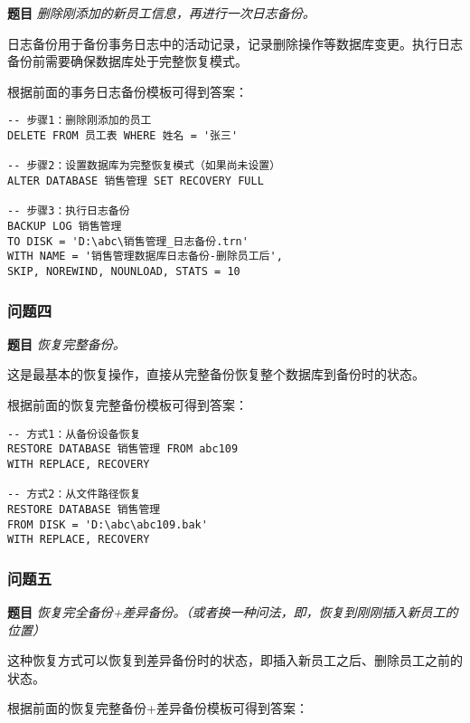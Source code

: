 \textbf{题目} \emph{删除刚添加的新员工信息，再进行一次日志备份。}

\qquad 日志备份用于备份事务日志中的活动记录，记录删除操作等数据库变更。执行日志备份前需要确保数据库处于完整恢复模式。

\qquad 根据前面的事务日志备份模板可得到答案：

\begin{mdframed}[backgroundcolor=blue!5]
\begin{verbatim}
-- 步骤1：删除刚添加的员工
DELETE FROM 员工表 WHERE 姓名 = '张三'

-- 步骤2：设置数据库为完整恢复模式（如果尚未设置）
ALTER DATABASE 销售管理 SET RECOVERY FULL

-- 步骤3：执行日志备份
BACKUP LOG 销售管理
TO DISK = 'D:\abc\销售管理_日志备份.trn'
WITH NAME = '销售管理数据库日志备份-删除员工后',
SKIP, NOREWIND, NOUNLOAD, STATS = 10
\end{verbatim}
\end{mdframed}

\subsubsection{问题四}

\textbf{题目} \emph{恢复完整备份。}

\qquad 这是最基本的恢复操作，直接从完整备份恢复整个数据库到备份时的状态。

\qquad 根据前面的恢复完整备份模板可得到答案：

\begin{mdframed}[backgroundcolor=blue!5]
\begin{verbatim}
-- 方式1：从备份设备恢复
RESTORE DATABASE 销售管理 FROM abc109
WITH REPLACE, RECOVERY

-- 方式2：从文件路径恢复
RESTORE DATABASE 销售管理
FROM DISK = 'D:\abc\abc109.bak'
WITH REPLACE, RECOVERY
\end{verbatim}
\end{mdframed}

\subsubsection{问题五}

\textbf{题目} \emph{恢复完全备份+差异备份。（或者换一种问法，即，恢复到刚刚插入新员工的位置）}

\qquad 这种恢复方式可以恢复到差异备份时的状态，即插入新员工之后、删除员工之前的状态。

\qquad 根据前面的恢复完整备份+差异备份模板可得到答案：

